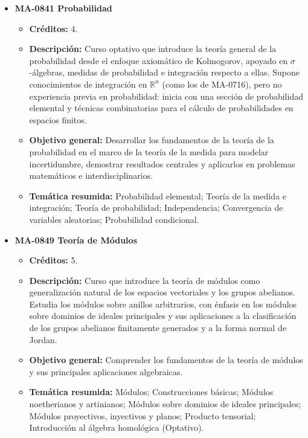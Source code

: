 \begin{itemize}[leftmargin=1.3em, itemsep=10pt, topsep=4pt, label={\color{Azul-UCR}$\blacksquare$}]
\item {\color{Azul-UCR}\textbf{MA-0841 Probabilidad}}\par\nopagebreak\smallskip
\begin{itemize}[leftmargin=1.1em, itemsep=3pt, topsep=2pt, parsep=2pt, label={\textendash}]
\item \textbf{Créditos:} 4.
\item \textbf{Descripción:} Curso optativo que introduce la teoría general de la probabilidad desde el enfoque axiomático de Kolmogorov, apoyado en $\sigma$-álgebras, medidas de probabilidad e integración respecto a ellas. Supone conocimientos de integración en $\mathbb{R}^n$ (como los de MA-0716), pero no experiencia previa en probabilidad: inicia con una sección de probabilidad elemental y técnicas combinatorias para el cálculo de probabilidades en espacios finitos.
\item \textbf{Objetivo general:} Desarrollar los fundamentos de la teoría de la probabilidad en el marco de la teoría de la medida para modelar incertidumbre, demostrar resultados centrales y aplicarlos en problemas matemáticos e interdisciplinarios.
\item \textbf{Temática resumida:} Probabilidad elemental; Teoría de la medida e integración; Teoría de probabilidad; Independencia; Convergencia de variables aleatorias; Probabilidad condicional.
\end{itemize}

\item {\color{Azul-UCR}\textbf{MA-0849 Teoría de Módulos}}\par\nopagebreak\smallskip
\begin{itemize}[leftmargin=1.1em, itemsep=3pt, topsep=2pt, parsep=2pt, label={\textendash}]
\item \textbf{Créditos:} 5.
\item \textbf{Descripción:} Curso que introduce la teoría de módulos como generalización natural de los espacios vectoriales y los grupos abelianos. Estudia los módulos sobre anillos arbitrarios, con énfasis en los módulos sobre dominios de ideales principales y sus aplicaciones a la clasificación de los grupos abelianos finitamente generados y a la forma normal de Jordan.
\item \textbf{Objetivo general:} Comprender los fundamentos de la teoría de módulos y sus principales aplicaciones algebraicas.
\item \textbf{Temática resumida:} Módulos; Construcciones básicas; Módulos noetherianos y artinianos; Módulos sobre dominios de ideales principales; Módulos proyectivos, inyectivos y planos; Producto tensorial; Introducción al álgebra homológica (Optativo).
\end{itemize}


\end{itemize}
